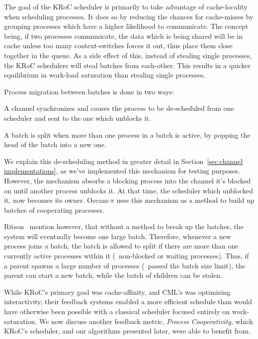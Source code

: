 The goal of the KRoC scheduler is primarily to take advantage of cache-locality
when scheduling processes. It does so by reducing the chances for cache-misses
by grouping processes which have a higher likelihood to communicate. The concept 
being, if two processes communicate, the data which is being shared will be in
cache unless too many context-switches forces it out, thus place them close
together in the queue. As a side effect of this, instead of stealing single 
processes, the KRoC schedulers will steal batches from each-other. This results
in a quicker equilibrium in work-load saturation than stealing single processes.

Process migration between batches is done in two ways: 
\begin{inparaenum}
\item A channel synchronizes and causes the process to be de-scheduled from
one scheduler and sent to the one which unblocks it.
\item A batch is split when more than one process in a batch is active, by 
popping the head of the batch into a new one.
\end{inparaenum}
We explain this de-scheduling method in greater detail in 
Section~\ref{sec:channel implementations}, as we've implemented this mechanism for
testing purposes. However, the mechanism absorbs a blocking process into the 
channel it's blocked on until another process unblocks it. At that time, the
scheduler which unblocked it, now becomes its owner. Occam-$\pi$ uses this 
mechanism as a method to build up batches of cooperating processes.

Ritson \etal~mention however, that without a method to break up the batches, the
system will eventually become one large batch. Therefore, whenever a new process 
joins a batch, the batch is allowed to split if there are more than one currently
active processes within it (\eg~non-blocked or waiting processes). Thus, if a
parent spawns a large number of processes (\ie~passed the batch size limit), the
parent can start a new batch, while the batch of children can be stolen.

While KRoC's primary goal was cache-affinity, and CML's was optimizing 
interactivity, their feedback systems enabled a more efficient schedule than
would have otherwise been possible with a classical scheduler focused entirely on 
work-saturation. We now discuss another feedback metric, 
\emph{Process Cooperativity}, 
which KRoC's scheduler, and our algorithms presented later, were able to 
benefit from.

